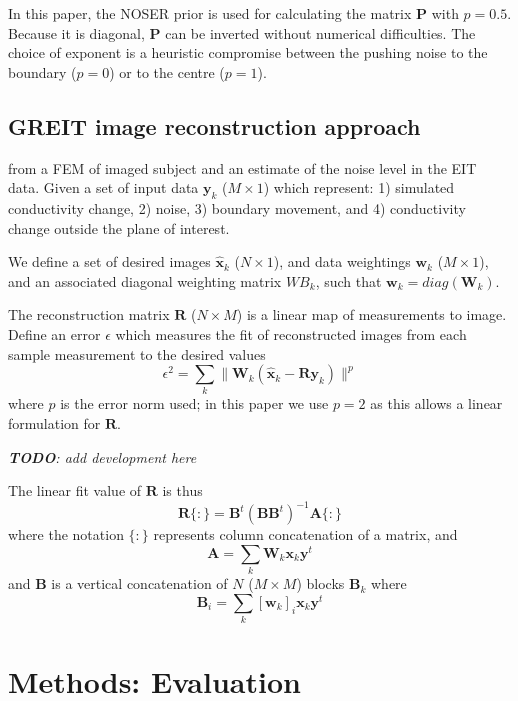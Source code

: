 \documentclass[12pt]{iopart}
\newcommand{\xB}{\mbox{$\mathbf{x}$}}
\newcommand{\xH}{\mbox{$\mathbf{\hat x}$}}
\newcommand{\yB}{\mbox{$\mathbf{y}$}}
\newcommand{\wB}{\mbox{$\mathbf{w}$}}
\newcommand{\AB}{\mbox{$\mathbf{A}$}}
\newcommand{\BB}{\mbox{$\mathbf{B}$}}
\newcommand{\RB}{\mbox{$\mathbf{R}$}}
\renewcommand{\PB}{\mbox{$\mathbf{P}$}}
\newcommand{\WB}{\mbox{$\mathbf{W}$}}
\begin{document}
In this paper, the NOSER prior is used for calculating the matrix
$\PB$ with $p=0.5$.
Because it is diagonal, $\PB$ can be
inverted without numerical difficulties. The choice of exponent is
a heuristic compromise between the pushing noise to the boundary
($p=0$) or to the centre ($p=1$).


\subsection{GREIT image reconstruction approach}

 from a FEM of imaged subject and an estimate of
the noise level in the EIT data.
Given a set of input data $\yB_k$ ($M\times1$) which 
represent:
1) simulated conductivity change,
2) noise,
3) boundary movement,
and
4) conductivity change outside the plane of interest.

We define a set of desired images $\xH_k$ ($N\times1$),
and data weightings $\wB_k$ ($M\times1$), and an associated
diagonal weighting matrix $WB_k$, such that 
$\wB_k = diag(\WB_k)$.

The reconstruction matrix $\RB$ ($N\times M$) is a linear
map of measurements to image.
Define an error $\epsilon$ which measures the fit
of reconstructed images from each sample measurement to
the desired values
\begin{equation}
\epsilon^2 =
\sum_k \|\WB_k ( \xH_k - \RB \yB_k ) \|^p
\end{equation}
where $p$ is the error norm used; in this paper we use $p=2$
as this allows a linear formulation for $\RB$. 

{\em {\bf TODO}: add development here}

The linear fit value of $\RB$ is thus
\begin{equation}
\RB\{:\} = \BB^t (\BB \BB^t)^{-1} \AB\{:\}
\end{equation}
where the notation $\{:\}$ represents column
concatenation of a matrix, and
\begin{equation}
\AB = \sum_k \WB_k \xB_k \yB^t
\end{equation}
and $\BB$ is a vertical concatenation of $N$
($M \times M$) blocks $\BB_k$ where
\begin{equation}
\BB_i = \sum_k [\wB_k]_i \xB_k \yB^t
\end{equation}




\section{Methods: Evaluation}
\end{document}

